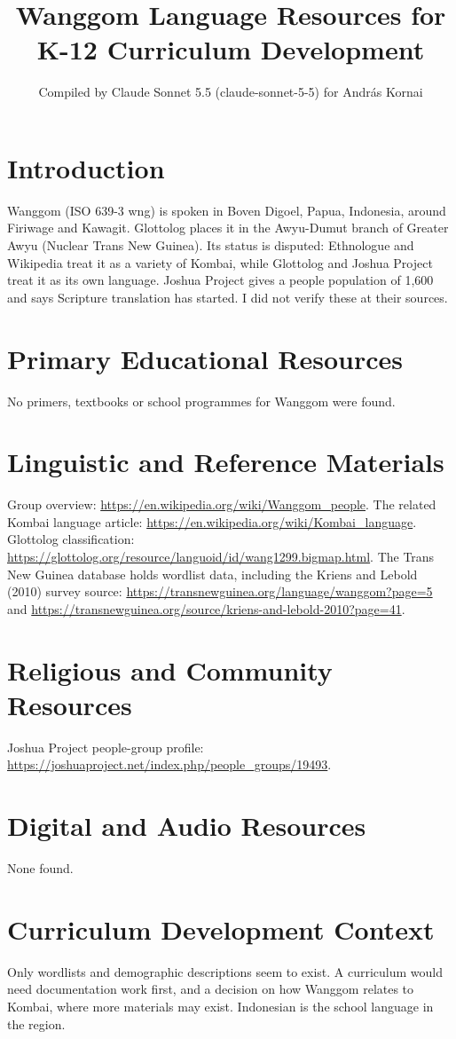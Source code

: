 \documentclass[12pt]{article}
\title{Wanggom Language Resources for K-12 Curriculum Development}
\author{Compiled by Claude Sonnet 5.5 (claude-sonnet-5-5) for Andr\'as Kornai}
\date{}
\begin{document}
\maketitle

\section{Introduction}
Wanggom (ISO 639-3 wng) is spoken in Boven Digoel, Papua, Indonesia, around Firiwage and Kawagit. Glottolog places it in the Awyu-Dumut branch of Greater Awyu (Nuclear Trans New Guinea). Its status is disputed: Ethnologue and Wikipedia treat it as a variety of Kombai, while Glottolog and Joshua Project treat it as its own language. Joshua Project gives a people population of 1,600 and says Scripture translation has started. I did not verify these at their sources.

\section{Primary Educational Resources}
No primers, textbooks or school programmes for Wanggom were found.

\section{Linguistic and Reference Materials}
Group overview: \url{https://en.wikipedia.org/wiki/Wanggom_people}. The related Kombai language article: \url{https://en.wikipedia.org/wiki/Kombai_language}. Glottolog classification: \url{https://glottolog.org/resource/languoid/id/wang1299.bigmap.html}. The Trans New Guinea database holds wordlist data, including the Kriens and Lebold (2010) survey source: \url{https://transnewguinea.org/language/wanggom?page=5} and \url{https://transnewguinea.org/source/kriens-and-lebold-2010?page=41}.

\section{Religious and Community Resources}
Joshua Project people-group profile: \url{https://joshuaproject.net/index.php/people_groups/19493}.

\section{Digital and Audio Resources}
None found.

\section{Curriculum Development Context}
Only wordlists and demographic descriptions seem to exist. A curriculum would need documentation work first, and a decision on how Wanggom relates to Kombai, where more materials may exist. Indonesian is the school language in the region.
\end{document}
